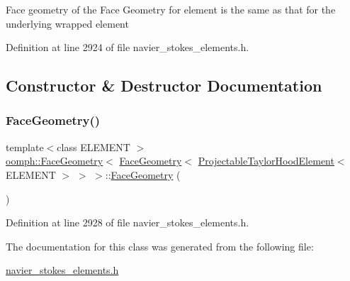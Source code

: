 Face geometry of the Face Geometry for element is the same as that for the underlying wrapped element 

Definition at line 2924 of file navier\+\_\+stokes\+\_\+elements.\+h.



\subsection{Constructor \& Destructor Documentation}
\mbox{\label{classoomph_1_1FaceGeometry_3_01FaceGeometry_3_01ProjectableTaylorHoodElement_3_01ELEMENT_01_4_01_4_01_4_a5656bb5469d433f46209af2ed69faf38}} 
\subsubsection{\texorpdfstring{Face\+Geometry()}{FaceGeometry()}}
{\footnotesize\ttfamily template$<$class E\+L\+E\+M\+E\+NT $>$ \\
\hyperlink{classoomph_1_1FaceGeometry}{oomph\+::\+Face\+Geometry}$<$ \hyperlink{classoomph_1_1FaceGeometry}{Face\+Geometry}$<$ \hyperlink{classoomph_1_1ProjectableTaylorHoodElement}{Projectable\+Taylor\+Hood\+Element}$<$ E\+L\+E\+M\+E\+NT $>$ $>$ $>$\+::\hyperlink{classoomph_1_1FaceGeometry}{Face\+Geometry} (\begin{DoxyParamCaption}{ }\end{DoxyParamCaption})\hspace{0.3cm}{\ttfamily [inline]}}



Definition at line 2928 of file navier\+\_\+stokes\+\_\+elements.\+h.



The documentation for this class was generated from the following file\+:\begin{DoxyCompactItemize}
\item 
\hyperlink{navier__stokes__elements_8h}{navier\+\_\+stokes\+\_\+elements.\+h}\end{DoxyCompactItemize}
